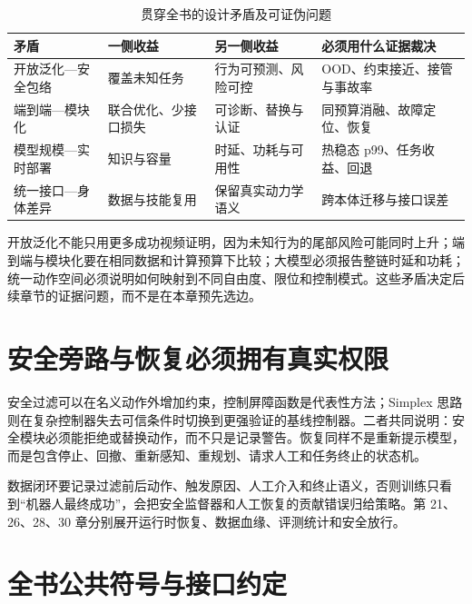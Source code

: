 \begin{table}[H]
\begingroup
{}
\centering
\caption{贯穿全书的设计矛盾及可证伪问题}
\label{tab:core-system-tensions}
\begin{tabularx}{\textwidth}{p{}YYp{0.24\textwidth}}
\toprule
矛盾 & 一侧收益 & 另一侧收益 & 必须用什么证据裁决 \\
\midrule
开放泛化—安全包络 & 覆盖未知任务 & 行为可预测、风险可控 & OOD、约束接近、接管与事故率 \\
端到端—模块化 & 联合优化、少接口损失 & 可诊断、替换与认证 & 同预算消融、故障定位、恢复 \\
模型规模—实时部署 & 知识与容量 & 时延、功耗与可用性 & 热稳态 p99、任务收益、回退 \\
统一接口—身体差异 & 数据与技能复用 & 保留真实动力学语义 & 跨本体迁移与接口误差 \\
\bottomrule
\end{tabularx}
\endgroup
\end{table}

开放泛化不能只用更多成功视频证明，因为未知行为的尾部风险可能同时上升；端到端与模块化要在相同数据和计算预算下比较；大模型必须报告整链时延和功耗；统一动作空间必须说明如何映射到不同自由度、限位和控制模式。这些矛盾决定后续章节的证据问题，而不是在本章预先选边。

\section{安全旁路与恢复必须拥有真实权限}

\begingroup{}
安全过滤可以在名义动作外增加约束，控制屏障函数是代表性方法\cite{ames2017cbf}；Simplex 思路则在复杂控制器失去可信条件时切换到更强验证的基线控制器\cite{sha2001simplex}。二者共同说明：安全模块必须能拒绝或替换动作，而不只是记录警告。恢复同样不是重新提示模型，而是包含停止、回撤、重新感知、重规划、请求人工和任务终止的状态机。
\endgroup

数据闭环要记录过滤前后动作、触发原因、人工介入和终止语义，否则训练只看到“机器人最终成功”，会把安全监督器和人工恢复的贡献错误归给策略。第 21、26、28、30 章分别展开运行时恢复、数据血缘、评测统计和安全放行。

\section{全书公共符号与接口约定}

